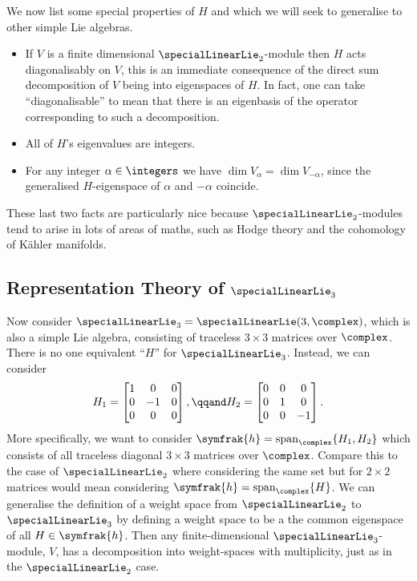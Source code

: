 \documentclass[fleqn]{NotesClass}
\DeclareMathOperator{\Span}{span}
\newcommand{\csa}{\symfrak{h}}
\begin{document}
    We now list some special properties of \(H\) and which we will seek to generalise to other simple Lie algebras.
    \begin{itemize}
        \item If \(V\) is a finite dimensional \(\specialLinearLie_2\)-module then \(H\) acts diagonalisably on \(V\), this is an immediate consequence of the direct sum decomposition of \(V\) being into eigenspaces of \(H\).
        In fact, one can take \enquote{diagonalisable} to mean that there is an eigenbasis of the operator corresponding to such a decomposition.
        \item All of \(H\)'s eigenvalues are integers.
        \item For any integer \(\alpha \in \integers\) we have \(\dim V_\alpha = \dim V_{-\alpha}\), since the generalised \(H\)-eigenspace of \(\alpha\) and \(-\alpha\) coincide.
    \end{itemize}
    These last two facts are particularly nice because \(\specialLinearLie_2\)-modules tend to arise in lots of areas of maths, such as Hodge theory and the cohomology of K\"ahler manifolds.
    
    \subsection{Representation Theory of \texorpdfstring{\(\specialLinearLie_3\)}{sl3}}
    Now consider \(\specialLinearLie_3 = \specialLinearLie(3, \complex)\), which is also a simple Lie algebra, consisting of traceless \(3 \times 3\) matrices over \(\complex\).
    There is no one equivalent \enquote{\(H\)} for \(\specialLinearLie_3\).
    Instead, we can consider
    \begin{equation}
        H_1 = 
        \begin{bmatrix}
            1 & 0 & 0\\
            0 & -1 & 0\\
            0 & 0 & 0
        \end{bmatrix}
        , \qqand H_2 =
        \begin{bmatrix}
            0 & 0 & 0\\
            0 & 1 & 0\\
            0 & 0 & -1
        \end{bmatrix}
        .
    \end{equation}
    More specifically, we want to consider \(\csa = \Span_{\complex}\{H_1, H_2\}\) which consists of all traceless diagonal \(3 \times 3\) matrices over \(\complex\).
    Compare this to the case of \(\specialLinearLie_2\) where considering the same set but for \(2 \times 2\) matrices would mean considering \(\csa = \Span_{\complex}\{H\}\).
    We can generalise the definition of a weight space from \(\specialLinearLie_2\) to \(\specialLinearLie_3\) by defining a weight space to be a the common eigenspace of all \(H \in \csa\).
    Then any finite-dimensional \(\specialLinearLie_3\)-module, \(V\), has a decomposition into weight-spaces with multiplicity, just as in the \(\specialLinearLie_2\) case.
    
\end{document}
